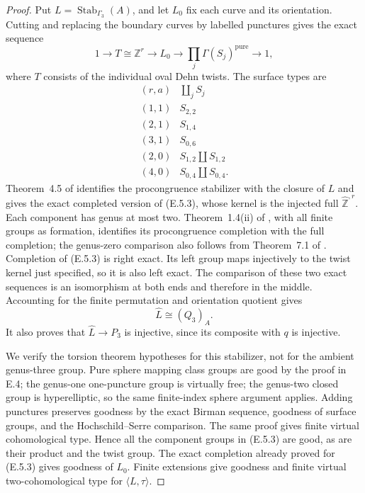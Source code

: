 \begin{proof}
Put $L=\operatorname{Stab}_{\Gamma_3}(A)$, and let $L_0$ fix
each curve and its orientation.  Cutting and replacing the
boundary curves by labelled punctures gives the exact sequence
\[
 1\longrightarrow T\cong\mathbb Z^r\longrightarrow L_0
       \longrightarrow\prod_j\Gamma(S_j)^{\mathrm{pure}}
       \longrightarrow1,                                    \tag{E.5.3}
\]
where $T$ consists of the individual oval Dehn twists.  The
surface types are
\[
\begin{array}{c|c}
 (r,a)&\coprod_j S_j\\\hline
 (1,1)&S_{2,2}\\
 (2,1)&S_{1,4}\\
 (3,1)&S_{0,6}\\
 (2,0)&S_{1,2}\amalg S_{1,2}\\
 (4,0)&S_{0,4}\amalg S_{0,4}.
\end{array}                                                   \tag{E.5.4}
\]
Theorem~4.5 of \cite{CEBoggiProcongruence2014} identifies the
procongruence stabilizer with the closure of $L$ and gives
the exact completed version of (E.5.3), whose kernel is the
injected full $\widehat{\mathbb Z}^{,r}$.  Each component
has genus at most two.  Theorem~1.4(ii) of
\cite{CEBoggiCongruence2020}, with all finite groups as
formation, identifies its procongruence completion with the
full completion; the genus-zero comparison also follows
from Theorem~7.1 of \cite{CEBoggiHyperelliptic2024}.
Completion of (E.5.3) is right exact.  Its left group maps
injectively to the twist kernel just specified, so it is
also left exact.  The comparison of these two exact
sequences is an isomorphism at both ends and therefore in
the middle.  Accounting for the finite permutation and
orientation quotient gives
\[
                     \widehat L\cong(Q_3)_A.                 \tag{E.5.5}
\]
It also proves that $\widehat L\to P_3$ is injective, since
its composite with $q$ is injective.

We verify the torsion theorem hypotheses for this stabilizer,
not for the ambient genus-three group.  Pure sphere mapping
class groups are good by the proof in E.4; the genus-one
one-puncture group is virtually free; the genus-two closed
group is hyperelliptic, so the same finite-index sphere
argument applies.  Adding punctures preserves goodness by
the exact Birman sequence, goodness of surface groups, and
the Hochschild--Serre comparison.  The same proof gives
finite virtual cohomological type.  Hence all the component
groups in (E.5.3) are good, as are their product and the
twist group.  The exact completion already proved for
(E.5.3) gives goodness of $L_0$.  Finite extensions give
goodness and finite virtual two-cohomological type for
$\langle L,\tau\rangle$.


\end{proof}
